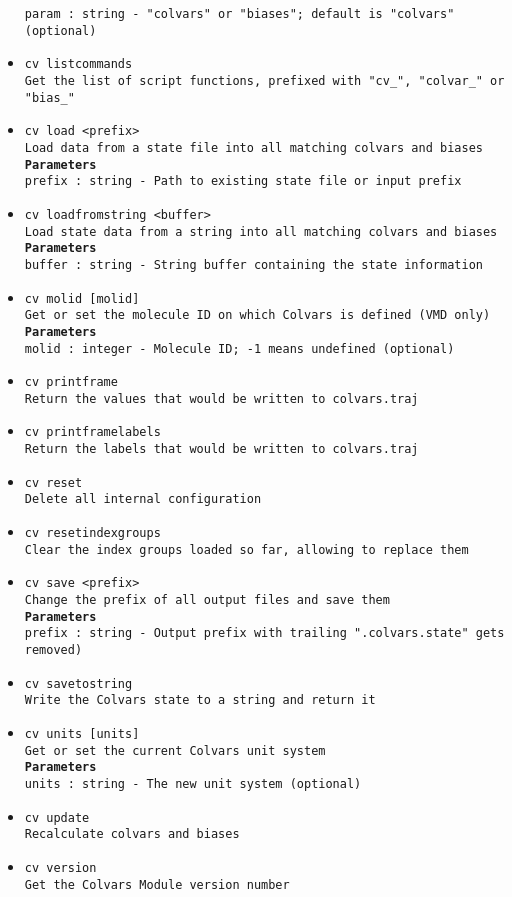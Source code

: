\begin{itemize}
\texttt{param : string - "colvars" or "biases"; default is "colvars" (optional)}
\item \texttt{cv listcommands}
\\
\texttt{Get the list of script functions, prefixed with "cv\_", "colvar\_" or "bias\_"}
\item \texttt{cv load <prefix>}
\\
\texttt{Load data from a state file into all matching colvars and biases}
\\
\texttt{\textbf{Parameters}}
\\
\texttt{prefix : string - Path to existing state file or input prefix}
\item \texttt{cv loadfromstring <buffer>}
\\
\texttt{Load state data from a string into all matching colvars and biases}
\\
\texttt{\textbf{Parameters}}
\\
\texttt{buffer : string - String buffer containing the state information}
\item \texttt{cv molid [molid]}
\\
\texttt{Get or set the molecule ID on which Colvars is defined (VMD only)}
\\
\texttt{\textbf{Parameters}}
\\
\texttt{molid : integer - Molecule ID; -1 means undefined (optional)}
\item \texttt{cv printframe}
\\
\texttt{Return the values that would be written to colvars.traj}
\item \texttt{cv printframelabels}
\\
\texttt{Return the labels that would be written to colvars.traj}
\item \texttt{cv reset}
\\
\texttt{Delete all internal configuration}
\item \texttt{cv resetindexgroups}
\\
\texttt{Clear the index groups loaded so far, allowing to replace them}
\item \texttt{cv save <prefix>}
\\
\texttt{Change the prefix of all output files and save them}
\\
\texttt{\textbf{Parameters}}
\\
\texttt{prefix : string - Output prefix with trailing ".colvars.state" gets removed)}
\item \texttt{cv savetostring}
\\
\texttt{Write the Colvars state to a string and return it}
\item \texttt{cv units [units]}
\\
\texttt{Get or set the current Colvars unit system}
\\
\texttt{\textbf{Parameters}}
\\
\texttt{units : string - The new unit system (optional)}
\item \texttt{cv update}
\\
\texttt{Recalculate colvars and biases}
\item \texttt{cv version}
\\
\texttt{Get the Colvars Module version number}
\end{itemize}
